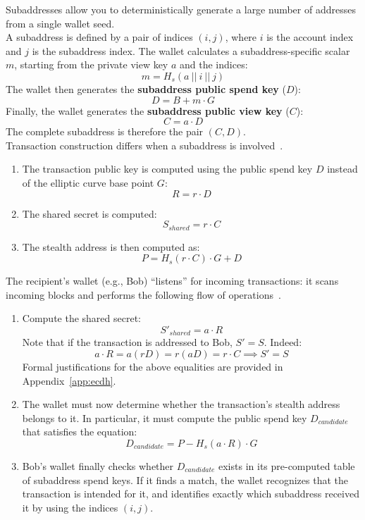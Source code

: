 \documentclass[conference]{IEEEtran}
\begin{document}
Subaddresses allow you to deterministically generate a large number of addresses from a single wallet seed.\\
A subaddress is defined by a pair of indices $(i, j)$, where $i$ is the account index and $j$ is the subaddress index. The wallet calculates a subaddress-specific scalar $m$, starting from the private view key $a$ and the indices:
\[
m = H_s(a \ || \ i \ | | \ j)
\]
The wallet then generates the \textbf{subaddress public spend key} ($D$):
\[
D = B + m \cdot G
\]
Finally, the wallet generates the \textbf{subaddress public view key} ($C$):
\[
C = a \cdot D
\]
The complete subaddress is therefore the pair $(C, D)$.~\cite{subaddresses_doc, subaddresses_mrl}\\

Transaction construction differs when a subaddress is involved~\cite{subaddresses_doc, subaddresses_mrl}.
\begin{enumerate}
\item The transaction public key is computed using the public spend key $D$ instead of the elliptic curve base point $G$:
\[
R = r \cdot D
\]
\item The shared secret is computed:
\[
S_{shared} = r \cdot C
\]
\item The stealth address is then computed as:
\[
P = H_s(r \cdot C) \cdot G + D
\]
\end{enumerate}
\medskip
The recipient's wallet (e.g., Bob) ``listens'' for incoming transactions: it scans incoming blocks and performs the following flow of operations~\cite{subaddresses_doc, subaddresses_mrl}.
\begin{enumerate}
\item Compute the shared secret:
\[
S'_{shared} = a \cdot R
\]
Note that if the transaction is addressed to Bob, $S' = S$. Indeed:
\[
a \cdot R = a(rD) = r(aD) = r \cdot C \implies S' = S
\]
Formal justifications for the above equalities are provided in Appendix~\ref{app:ecdh}.
\item The wallet must now determine whether the transaction's stealth address belongs to it. In particular, it must compute the public spend key $D_{candidate}$ that satisfies the equation:
\[
D_{candidate} = P - H_s(a \cdot R) \cdot G
\]
\item Bob's wallet finally checks whether $D_{candidate}$ exists in its pre-computed table of subaddress spend keys. If it finds a match, the wallet recognizes that the transaction is intended for it, and identifies exactly which subaddress received it by using the indices $(i, j)$.
\end{enumerate}
\end{document}
